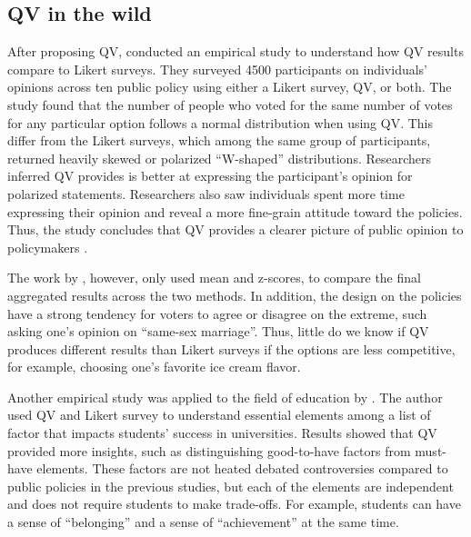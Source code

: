 \subsection{QV in the wild}
After proposing QV,
\textcite{quarfoot2017quadratic} conducted an 
empirical study to understand how 
QV results compare to Likert surveys.
They surveyed 4500 participants 
on individuals' opinions
across ten public policy
using either a Likert survey, QV, or both.
The study found that the number of people
who voted for the same number of votes
for any particular option 
follows a normal distribution when using QV.
This differ from the Likert surveys,
which among the same group of participants,
returned heavily skewed 
or polarized ``W-shaped'' distributions.
Researchers inferred 
QV provides is better at expressing the participant's opinion
for polarized statements.
Researchers also saw individuals 
spent more time expressing their opinion
and reveal a more fine-grain attitude 
toward the policies.
Thus, the study concludes that 
QV provides a clearer picture 
of public opinion to policymakers
\cite{quarfoot2017quadratic}.

The work by \textcite{quarfoot2017quadratic}, however,
only used mean and z-scores,
to compare the final aggregated results 
across the two methods.
In addition, 
the design on the policies 
have a strong tendency for voters
to agree or disagree on the extreme,
such asking one's opinion on ``same-sex marriage''.
Thus, little do we know if
QV produces different results 
than Likert surveys
if the options are less competitive,
for example, choosing one's favorite ice cream flavor.\par

Another empirical study was applied to 
the field of education 
by \textcite{naylor2017first}. 
The author used QV and Likert survey
to understand essential elements 
among a list of factor
that impacts students' success in universities.
Results showed that QV provided more insights, 
such as distinguishing good-to-have factors from must-have elements.
These factors are not heated debated controversies
compared to public policies in the previous studies, 
but each of the elements are independent and does not require 
students to make trade-offs.
For example, students can have a sense of ``belonging'' and
a sense of ``achievement'' at the same time.

